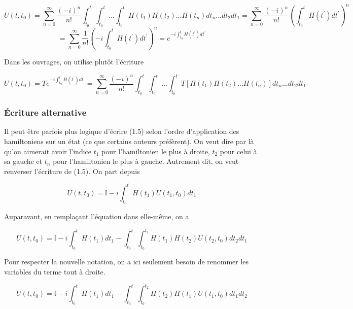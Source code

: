 \begin{equation*}
    U(t,t_0) = \sum_{n=0}^{\infty}\frac{(-i)^n}{n!}\int_{t_0}^{t}\int_{t_0}^{t}...\int_{t_0}^{t}H(t_1)H(t_2)...H(t_n)dt_n ... dt_2 dt_1 = \sum_{n=0}^{\infty}\frac{(-i)^n}{n!}\left(\int_{t_0}^{t}H(t^{'})dt^{'}\right)^n
\end{equation*}
\begin{equation*}
    = \sum_{n=0}^{\infty}\frac{1}{n!}\left(-i\int_{t_0}^{t}H(t^{'})dt^{'}\right)^n = e^{-i\int_{t_0}^{t}H(t^{'})dt^{'}}
\end{equation*}

Dans les ouvrages, on utilise plutôt l'écriture

\begin{equation}
    U(t,t_0) = Te^{-i\int_{t_0}^{t}H(t^{'})dt^{'}} = \sum_{n=0}^{\infty}\frac{(-i)^n}{n!}\int_{t_0}^{t}\int_{t_0}^{t}...\int_{t_0}^{t} T \left[H(t_1)H(t_2)...H(t_n)\right]dt_n ... dt_2 dt_1
\end{equation}

\subsubsection{Écriture alternative}
Il peut être parfois plus logique d'écrire (1.5) selon l'ordre d'application des hamiltoniens sur un état (ce que certains auteurs préfèrent). On veut dire par là qu'on aimerait avoir l'indice $t_1$ pour l'hamiltonien le plus à droite, $t_2$ pour celui à sa gauche et $t_n$ pour l'hamiltonien le plus à gauche. Autrement dit, on veut renverser l'écriture de (1.5). On part depuis 

\begin{equation*}
    U(t,t_0) = \mathbb{I} -i\int_{t_0}^{t}H(t_1)U(t_1,t_0)dt_1
\end{equation*}

Auparavant, en remplaçant l'équation dans elle-même, on a 

\begin{equation*}
    U(t,t_0) = \mathbb{I} -i\int_{t_0}^{t}H(t_1)dt_1 - \int_{t_0}^{t}\int_{t_0}^{t_1}H(t_1)H(t_2)U(t_2,t_0)dt_2dt_1
\end{equation*}

Pour respecter la nouvelle notation, on a ici seulement besoin de renommer les variables du terme tout à droite.

\begin{equation*}
    U(t,t_0) = \mathbb{I} -i\int_{t_0}^{t}H(t_1)dt_1 - \int_{t_0}^{t}\int_{t_0}^{t_2}H(t_2)H(t_1)U(t_1,t_0)dt_1dt_2
\end{equation*}

